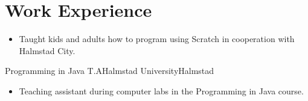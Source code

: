 \documentclass[11pt,a4paper,sans,colorlinks,linkcolor=blue,urlcolor=blue]{moderncv}
\begin{document}
\makecvtitle
\setlength{\parskip}{0.15em}
\vspace{-40.0pt}

\section{Work Experience}

{\begin{itemize}
    \itemsep0.3em
    \setlength{\itemindent}{.25in}
    \item Taught kids and adults how to program using Scratch in cooperation with Halmstad City.
\end{itemize} }

{Programming in Java T.A}{Halmstad University}{Halmstad}{}
{\begin{itemize}
    \itemsep0.3em
    \setlength{\itemindent}{.25in}
    \item Teaching assistant during computer labs in the Programming in Java course.
\end{itemize}}
\end{document}
